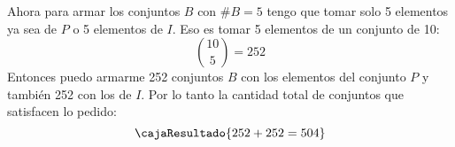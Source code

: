 \begin{enumerate}[label=\enumeracion]
        Ahora para armar los conjuntos $B$ con $\#B = 5$ tengo que tomar solo 5
        elementos ya sea de $P$ o 5 elementos de $I$. Eso es tomar 5 elementos de un conjunto de 10:
        $$
            \binom{10}{5} = 252
        $$
        Entonces puedo armarme 252 conjuntos $B$ con los elementos del conjunto $P$
        y también 252 con los de $I$. Por lo tanto la cantidad total de conjuntos que satisfacen lo pedido:
        $$
        \cajaResultado{252 + 252 = 504}
        $$
\end{enumerate}

\begin{aportes}
  \item {}
  \item {}
\end{aportes}
